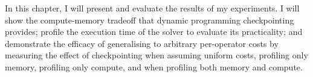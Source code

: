 In this chapter, I will present and evaluate the results of my experiments.
I will show the compute-memory tradeoff that dynamic programming checkpointing provides; profile the execution time of the solver to evaluate its practicality; and demonstrate the efficacy of generalising to arbitrary per-operator costs by measuring the effect of checkpointing when assuming uniform costs, profiling only memory, profiling only compute, and when profiling both memory and compute.
